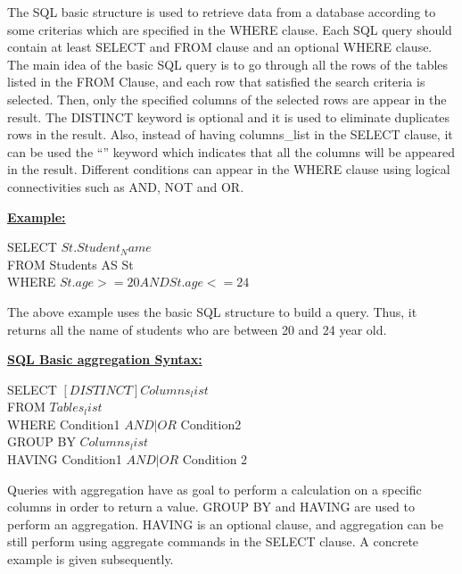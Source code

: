 The SQL basic structure is used to retrieve data from a database according to some criterias which are specified in the WHERE clause. Each SQL query should contain at least SELECT and FROM clause and an optional WHERE clause. The main idea of the basic SQL query is to go through all the rows of the tables listed in the FROM Clause, and each row that satisfied the search criteria is selected. Then, only the specified columns of the selected rows are appear in the result. The DISTINCT keyword is optional and it is used to eliminate duplicates rows in the result. Also, instead of having columns\_list in the SELECT clause, it can be used the “\*” keyword which indicates that all the columns will be appeared in the result. Different conditions can appear in the WHERE clause using logical connectivities such as AND, NOT and OR.  

\textbf{\underline{Example:}}
\begin{mdframed}[backgroundcolor=gray!20] 
SELECT $St.Student_Name$
\\FROM Students AS St 
\\WHERE $St.age >= 20 AND St.age <= 24$
\end{mdframed}

The above example uses the basic SQL structure to build a query. Thus, it returns all the name of students who are between 20 and 24 year old. 

\textbf{\underline{SQL Basic aggregation Syntax:} }
\begin{mdframed}[backgroundcolor=gray!20] 
SELECT         $[DISTINCT]  Columns_list$
\\FROM         $Tables_list$
\\WHERE       Condition1 ${AND|OR}$ Condition2
\\GROUP BY   $ Columns_list$
\\HAVING     Condition1 ${AND|OR}$ Condition 2
\end{mdframed}

Queries with aggregation have as goal to perform a calculation on a specific columns in order to return a value. GROUP BY and HAVING are used to perform an aggregation. HAVING is an optional clause, and aggregation can be still perform using aggregate commands in the SELECT clause. A concrete example is given subsequently. 

